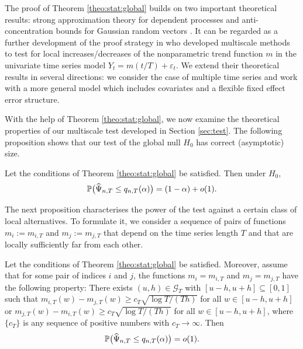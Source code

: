 \documentclass[12pt]{article}
\begin{document}
\begin{remark}
The proof of Theorem \ref{theo:stat:global} builds on two important theoretical results: strong approximation theory for dependent processes \citep{BerkesLiuWu2014} and anti-concentration bounds for Gaussian random vectors \citep{Nazarov2003}. It can be regarded as a further development of the proof strategy in \cite{KhismatullinaVogt2020} who developed multiscale methods to test for local increases/decreases of the nonparametric trend function $m$ in the univariate time series model $Y_t = m(t/T) + \varepsilon_t$. We extend their theoretical results in several directions: we consider the case of multiple time series and work with a more general model which includes covariates and a flexible fixed effect error structure.  
\end{remark}


With the help of Theorem \ref{theo:stat:global}, we now examine the theoretical properties of our multiscale test developed in Section \ref{sec:test}. The following proposition shows that our test of the global null $H_0$ has correct (asymptotic) size.
\begin{prop}\label{prop:test}
Let the conditions of Theorem \ref{theo:stat:global} be satisfied. Then under $H_0$, 
\[ \mathbb{P} \big( \widehat{\Psi}_{n,T} \le q_{n,T}(\alpha) \big) = (1 - \alpha) + o(1). \]
\end{prop}
The next proposition characterises the power of the test against a certain class of local alternatives. To formulate it, we consider a sequence of pairs of functions $m_ i := m_{i,T}$ and $m_ j := m_{j,T}$ that depend on the time series length $T$ and that are locally sufficiently far from each other.
\begin{prop}\label{prop:test:power}
Let the conditions  of Theorem \ref{theo:stat:global} be satisfied. Moreover, assume that for some pair of indices $i$ and $j$, the functions $m_ i = m_{i,T}$ and $m_ j = m_{j,T}$ have the following property: There exists $(u, h) \in \mathcal{G}_T$ with $[u-h, u+h] \subseteq [0,1]$ such that $m_{i,T}(w) - m_{j,T}(w) \ge c_T \sqrt{\log T/(Th)}$ for all $w \in [u-h, u+h]$ or $m_{j,T}(w) - m_{i,T}(w) \ge c_T \sqrt{\log T/(Th)}$ for all $w \in [u-h, u+h]$, where $\{c_T\}$ is any sequence of positive numbers with $c_T \rightarrow \infty$. Then 
\[ \mathbb{P} \big( \widehat{\Psi}_{n,T} \le q_{n,T}(\alpha) \big) = o(1). \]
\end{prop}
\end{document}
